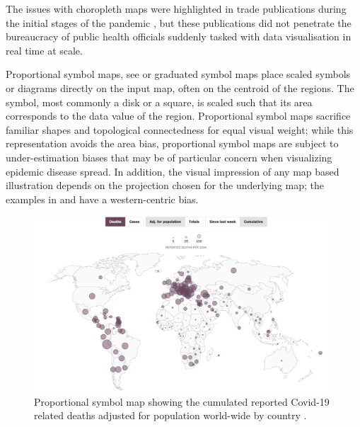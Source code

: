 \documentclass[article]{jdssv}\usepackage[]{graphicx}\usepackage[]{xcolor}
\begin{document}
The issues with choropleth maps were highlighted in trade publications during the initial stages of the pandemic \citep{fieldMappingCoronavirusResponsibly}, but these publications did not penetrate the bureaucracy of public health officials suddenly tasked with data visualisation in real time at scale. 

Proportional symbol maps, see  or graduated symbol maps place scaled symbols or diagrams directly on the input map, often on the centroid of the regions. 
The symbol, most commonly a disk or a square, is scaled such that its area corresponds to the data value of the region. 
Proportional symbol maps sacrifice familiar shapes and topological connectedness for equal visual weight\citep{gaoUsabilityValuebyalphaMaps2019}; while this representation avoids the area bias, proportional symbol maps are subject to under-estimation biases \citep{shimAnalysisMiddleSchool2008} that may be of particular concern when visualizing epidemic disease spread.
In addition, the visual impression of any map based illustration depends on the projection chosen for the underlying map; the examples in  and  have a western-centric bias.


\begin{figure}
	\includegraphics[width = 0.98\textwidth]{Figures_Web/wp_totaldeaths_propsymb.png}
	\caption{Proportional symbol map showing the cumulated reported Covid-19 related deaths adjusted for population world-wide by country \citep{alcantaraMappingWorldwideSpread}.}
	\label{fig:propsymb}
\end{figure}
\end{document}
